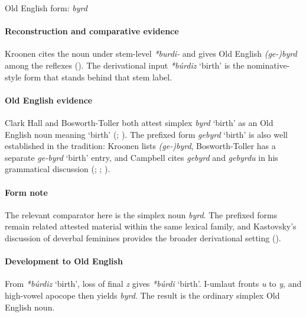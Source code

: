 \documentclass[
  british,
  a4paper,
]{article}
\providecommand{\Recon}[1]{\emph{*#1}}
\begin{document}
Old English form: \emph{byrd}

\paragraph{Reconstruction and comparative
evidence}\label{reconstruction-and-comparative-evidence-6}

Kroonen cites the noun under stem-level \emph{*burdi-} and gives Old
English \emph{(ge-)byrd} among the reflexes
(). The derivational input
\Recon{búrdiz} `birth' is the nominative-style form that stands behind
that stem label.

\paragraph{Old English evidence}\label{old-english-evidence-6}

Clark Hall and Bosworth-Toller both attest simplex {\emph{byrd}} `birth'
as an Old English noun meaning `birth'
(;
). The
prefixed form \emph{gebyrd} `birth' is also well established in the
tradition: Kroonen lists \emph{(ge-)byrd}, Bosworth-Toller has a
separate \emph{ge-byrd} `birth' entry, and Campbell cites \emph{gebyrd}
and \emph{gebyrdu} in his grammatical discussion
(;
;
).

\paragraph{Form note}\label{form-note}

The relevant comparator here is the simplex noun \emph{byrd}. The
prefixed forms remain related attested material within the same lexical
family, and Kastovsky's discussion of deverbal feminines provides the
broader derivational setting ().

\paragraph{Development to Old
English}\label{development-to-old-english-6}

From \Recon{búrdiz} `birth', loss of final \emph{z} gives \Recon{búrdi}
`birth'. I-umlaut fronts \emph{u} to \emph{y}, and high-vowel apocope
then yields \emph{byrd}. The result is the ordinary simplex Old English
noun.
\end{document}
